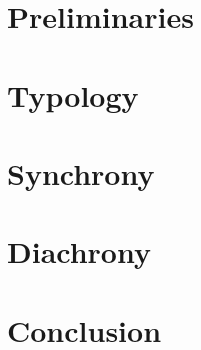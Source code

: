 \documentclass[output=short            %
 	        ,draftmode
	        ,table
	        ,newtxmath
		  ]{langsci/langscibook}
\begin{document}
   
\maketitle                

\frontmatter%

\tableofcontents      




\mainmatter         
\part{Preliminaries}\label{part:theory} %



\part{Typology} \label{part typ} %


\part{Synchrony} \label{part synchr} %



\part{Diachrony} \label{part diachr} %


\part{Conclusion}\label{part:concl} %

\end{document}
